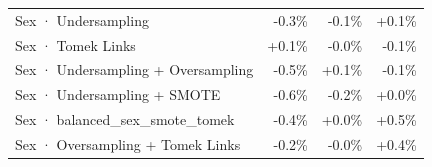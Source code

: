 \begin{table}[htbp]
\begin{tabular}{lrrr}
Sex · Undersampling & \textcolor{BrickRed}{-0.3\%} & \textcolor{BrickRed}{-0.1\%} & \textcolor{OliveGreen}{+0.1\%} \\
Sex · Tomek Links & \textcolor{OliveGreen}{+0.1\%} & \textcolor{BrickRed}{-0.0\%} & \textcolor{BrickRed}{-0.1\%} \\
Sex · Undersampling + Oversampling & \textcolor{BrickRed}{-0.5\%} & \textcolor{OliveGreen}{+0.1\%} & \textcolor{BrickRed}{-0.1\%} \\
Sex · Undersampling + SMOTE & \textcolor{BrickRed}{-0.6\%} & \textcolor{BrickRed}{-0.2\%} & \textcolor{OliveGreen}{+0.0\%} \\
Sex · balanced_sex_smote_tomek & \textcolor{BrickRed}{-0.4\%} & \textcolor{OliveGreen}{+0.0\%} & \textcolor{OliveGreen}{+0.5\%} \\
Sex · Oversampling + Tomek Links & \textcolor{BrickRed}{-0.2\%} & \textcolor{BrickRed}{-0.0\%} & \textcolor{OliveGreen}{+0.4\%} \\
\bottomrule
\end{tabular}
\end{table}